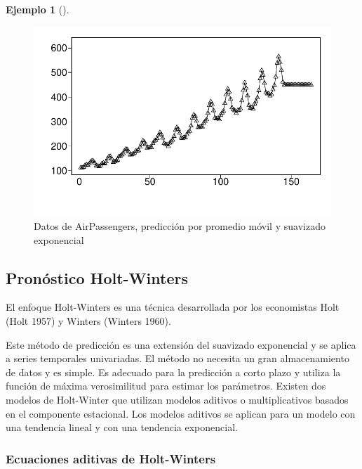 \documentclass[
  us-letterpaper,
]{scrreprt}
\theoremstyle{definition}
\newtheorem{example}{Ejemplo}[chapter]
\theoremstyle{plain}
\theoremstyle{plain}
\theoremstyle{definition}
\theoremstyle{remark}
\begin{document}
\begin{example}[]
\begin{tcolorbox}
\begin{figure}[H]
\begin{minipage}{0.33\linewidth}
{\includegraphics{series_files/figure-pdf/fig-PAP-3.pdf}

}


\end{minipage}%

\caption{\label{fig-PAP}Datos de AirPassengers, predicción por promedio
móvil y suavizado exponencial}

\end{figure}%

\end{tcolorbox}

\end{example}

\subsection{Pronóstico Holt-Winters}\label{pronuxf3stico-holt-winters}

El enfoque Holt-Winters es una técnica desarrollada por los economistas
Holt (Holt 1957) y Winters (Winters 1960).

Este método de predicción es una extensión del suavizado exponencial y
se aplica a series temporales univariadas. El método no necesita un gran
almacenamiento de datos y es simple. Es adecuado para la predicción a
corto plazo y utiliza la función de máxima verosimilitud para estimar
los parámetros. Existen dos modelos de Holt-Winter que utilizan modelos
aditivos o multiplicativos basados en el componente estacional. Los
modelos aditivos se aplican para un modelo con una tendencia lineal y
con una tendencia exponencial.

\subsubsection{Ecuaciones aditivas de
Holt-Winters}\label{ecuaciones-aditivas-de-holt-winters}
\end{document}
